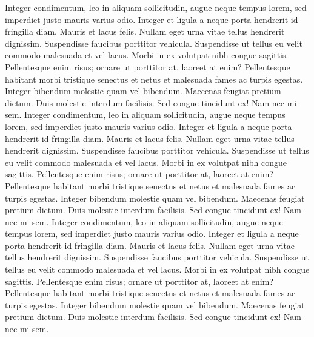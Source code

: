 \documentclass{article}
\begin{document}
\beginnumbering
\pstart
Integer condimentum, leo in aliquam sollicitudin, augue neque tempus lorem, sed imperdiet justo mauris varius odio. Integer et ligula a neque porta hendrerit id fringilla diam. Mauris et lacus felis. Nullam eget urna vitae tellus hendrerit dignissim. Suspendisse faucibus porttitor vehicula. Suspendisse ut tellus eu velit commodo malesuada et vel lacus. Morbi in ex volutpat nibh congue sagittis. Pellentesque enim risus; ornare ut porttitor at, laoreet at enim? Pellentesque habitant morbi tristique senectus et netus et malesuada fames ac turpis egestas. Integer bibendum molestie quam vel bibendum. Maecenas feugiat pretium dictum. Duis molestie interdum facilisis. Sed congue tincidunt ex! Nam nec mi sem.
Integer condimentum, leo in aliquam sollicitudin, augue neque tempus lorem, sed imperdiet justo mauris varius odio. Integer et ligula a neque porta hendrerit id fringilla diam. Mauris et lacus felis. Nullam eget urna vitae tellus hendrerit dignissim. Suspendisse faucibus porttitor vehicula. Suspendisse ut tellus eu velit commodo malesuada et vel lacus. Morbi in ex volutpat nibh congue sagittis. Pellentesque enim risus; ornare ut porttitor at, laoreet at enim? Pellentesque habitant morbi tristique senectus et netus et malesuada fames ac turpis egestas. Integer bibendum molestie quam vel bibendum. Maecenas feugiat pretium dictum. Duis molestie interdum facilisis. Sed congue tincidunt ex! Nam nec mi sem.
Integer condimentum, leo in aliquam sollicitudin, augue neque tempus lorem, sed imperdiet justo mauris varius odio. Integer et ligula a neque porta hendrerit id fringilla diam. Mauris et lacus felis. Nullam eget urna vitae tellus hendrerit dignissim. Suspendisse faucibus porttitor vehicula. Suspendisse ut tellus eu velit commodo malesuada et vel lacus. Morbi in ex volutpat nibh congue sagittis. Pellentesque enim risus; ornare ut porttitor at, laoreet at enim? Pellentesque habitant morbi tristique senectus et netus et malesuada fames ac turpis egestas. Integer bibendum molestie quam vel bibendum. Maecenas feugiat pretium dictum. Duis molestie interdum facilisis. Sed congue tincidunt ex! Nam nec mi sem.
\end{document}
